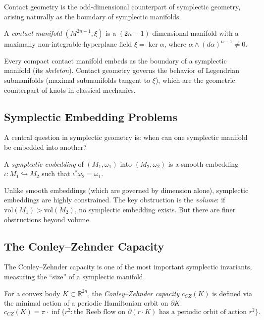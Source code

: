 Contact geometry is the odd-dimensional counterpart of symplectic geometry, arising naturally as the boundary of symplectic manifolds.

\begin{definition}
A \emph{contact manifold} $(M^{2n-1}, \xi)$ is a $(2n-1)$-dimensional manifold with a maximally non-integrable hyperplane field $\xi = \ker \alpha$, where $\alpha \wedge (d\alpha)^{n-1} \neq 0$.
\end{definition}

Every compact contact manifold embeds as the boundary of a symplectic manifold (its \emph{skeleton}). Contact geometry governs the behavior of Legendrian submanifolds (maximal submanifolds tangent to $\xi$), which are the geometric counterpart of knots in classical mechanics.

\subsection{Symplectic Embedding Problems}

A central question in symplectic geometry is: when can one symplectic manifold be embedded into another?

\begin{definition}
A \emph{symplectic embedding} of $(M_1, \omega_1)$ into $(M_2, \omega_2)$ is a smooth embedding $\iota: M_1 \hookrightarrow M_2$ such that $\iota^* \omega_2 = \omega_1$.
\end{definition}

Unlike smooth embeddings (which are governed by dimension alone), symplectic embeddings are highly constrained. The key obstruction is the \emph{volume}: if $\text{vol}(M_1) > \text{vol}(M_2)$, no symplectic embedding exists. But there are finer obstructions beyond volume.

\subsection{The Conley--Zehnder Capacity}

The Conley--Zehnder capacity is one of the most important symplectic invariants, measuring the ``size'' of a symplectic manifold.

\begin{definition}
For a convex body $K \subset \mathbb{R}^{2n}$, the \emph{Conley--Zehnder capacity} $c_{CZ}(K)$ is defined via the minimal action of a periodic Hamiltonian orbit on $\partial K$:
\[
c_{CZ}(K) = \pi \cdot \inf \{ r^2 : \text{the Reeb flow on } \partial(r \cdot K) \text{ has a periodic orbit of action } r^2 \}.
\]
\end{definition}

